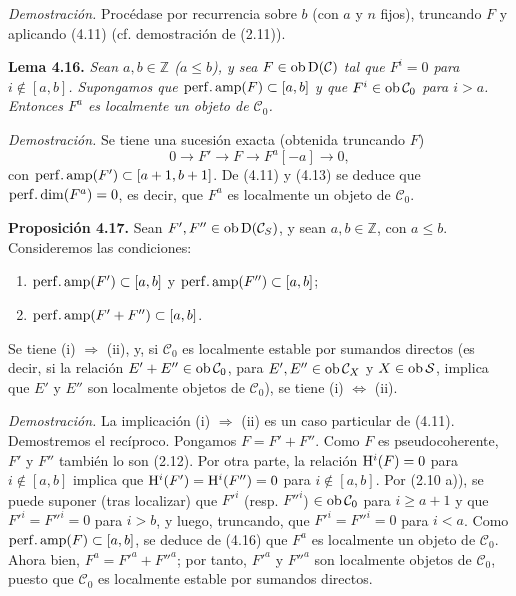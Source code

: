 \emph{Demostración.} Procédase por recurrencia sobre \(b\) (con \(a\) y \(n\) fijos), truncando \(F\) y aplicando (4.11) (cf. demostración de (2.11)).

\textbf{Lema 4.16.} \emph{Sean \(a,b\in\mathbb Z\) (\(a\leq b\)), y sea \(F\in\Ob\Dpx(\mathcal C)\) tal que \(F^i=0\) para \(i\notin[a,b]\). Supongamos que \(\perfamp(F)\subset[a,b]\) y que \(F^i\in\Ob\mathcal C_0\) para \(i>a\). Entonces \(F^a\) es localmente un objeto de \(\mathcal C_0\).}

\emph{Demostración.} Se tiene una sucesión exacta (obtenida truncando \(F\))
\[
  0\longrightarrow F'\longrightarrow F\longrightarrow F^a[-a]\longrightarrow 0,
\]
con \(\perfamp(F')\subset[a+1,b+1]\). De (4.11) y (4.13) se deduce que \(\perfdim(F^a)=0\), es decir, que \(F^a\) es localmente un objeto de \(\mathcal C_0\).

\textbf{Proposición 4.17.} Sean \(F',F''\in\Ob\Dpx(\mathcal C_S)\), y sean \(a,b\in\mathbb Z\), con \(a\leq b\). Consideremos las condiciones:
\begin{enumerate}[label=(\roman*)]
\item \(\perfamp(F')\subset[a,b]\) y \(\perfamp(F'')\subset[a,b]\);
\item \(\perfamp(F'+F'')\subset[a,b]\).
\end{enumerate}
Se tiene (i) \(\Rightarrow\) (ii), y, si \(\mathcal C_0\) es localmente estable por sumandos directos (es decir, si la relación \(E'+E''\in\Ob\mathcal C_0\), para \(E',E''\in\Ob\mathcal C_X\) y \(X\in\Ob \sisi{S}{\mathcal S}\), implica que \(E'\) y \(E''\) son localmente objetos de \(\mathcal C_0\)), se tiene (i) \(\Leftrightarrow\) (ii).

\emph{Demostración.} La implicación (i) \(\Rightarrow\) (ii) es un caso particular de (4.11). Demostremos el recíproco. Pongamos \(F=F'+F''\). Como \(F\) es pseudocoherente, \(F'\) y \(F''\) también lo son (2.12). Por otra parte, la relación \(\Ho^i(F)=0\) para \(i\notin[a,b]\) implica que \(\Ho^i(F')=\Ho^i(F'')=0\) para \(i\notin[a,b]\). Por (2.10 a)), se puede suponer (tras localizar) que \(F'^i\) (resp. \(F''^i\)) \(\in\Ob\mathcal C_0\) para \(i\geq a+1\) y que \(F'^i=F''^i=0\) para \(i>b\), y luego, truncando, que \(F'^i=F''^i=0\) para \(i<a\). Como \(\sisi{\perfdim(F)}{\perfamp(F)}\subset[a,b]\), se deduce de (4.16) que \(F^a\) es localmente un objeto de \(\mathcal C_0\). Ahora bien, \(F^a=F'^a+F''^a\); por tanto, \(F'^a\) y \(F''^a\) son localmente objetos de \(\mathcal C_0\), puesto que \(\mathcal C_0\) es localmente estable por sumandos directos.

